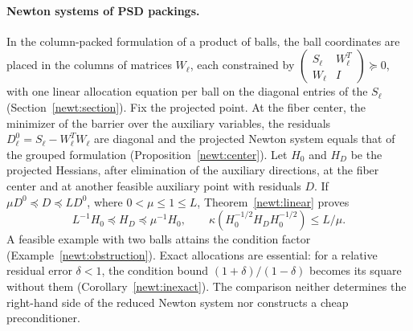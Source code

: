 \paragraph{Newton systems of PSD packings.}
In the column-packed formulation of a product of balls, the ball
coordinates are placed in the columns of matrices $W_\ell$, each
constrained by
$\left(\begin{smallmatrix}S_\ell&W_\ell^T\\W_\ell&I\end{smallmatrix}\right)\succeq0$,
with one linear allocation equation per ball on the diagonal entries of
the $S_\ell$ (Section~\ref{newt:section}). Fix the projected point. At
the fiber center, the minimizer of the barrier over the auxiliary
variables, the residuals $D_\ell^0=S_\ell-W_\ell^TW_\ell$ are diagonal
and the projected Newton system equals that of the grouped formulation
(Proposition~\ref{newt:center}). Let $H_0$ and $H_D$ be the projected
Hessians, after elimination of the auxiliary directions, at the fiber
center and at another feasible auxiliary point with residuals $D$. If
$\mu D^0\preceq D\preceq L D^0$, where $0<\mu\leq1\leq L$,
Theorem~\ref{newt:linear} proves
\begin{equation}\label{eq:intro-transfer}
 L^{-1}H_0\preceq H_D\preceq\mu^{-1}H_0,
 \qquad\kappa(H_0^{-1/2}H_DH_0^{-1/2})\leq L/\mu.
\end{equation}
A feasible example with two balls attains the condition factor
(Example~\ref{newt:obstruction}). Exact allocations are essential: for a
relative residual error $\delta<1$, the condition bound
$(1+\delta)/(1-\delta)$ becomes its square without them
(Corollary~\ref{newt:inexact}). The comparison neither determines the
right-hand side of the reduced Newton system nor constructs a cheap
preconditioner.

